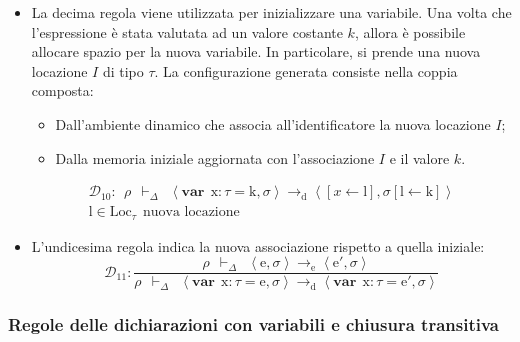 \documentclass[a4paper]{article}
\begin{document}
\begin{itemize}
 		\item La decima regola viene utilizzata per inizializzare una variabile. Una volta che l'espressione è stata valutata ad un valore costante $k$, allora è possibile allocare spazio per la nuova variabile. In particolare, si prende una nuova locazione $I$ di tipo $\tau$. La configurazione generata consiste nella coppia composta:
 		\begin{itemize}
 			\item Dall'ambiente dinamico che associa all'identificatore la nuova locazione $I$;
 			\item Dalla memoria iniziale aggiornata con l'associazione $I$ e il valore $k$.
 		\end{itemize}
 		\begin{gather*}
 			\mathcal{D}_{10} : \:\: \rho \:\: \vdash_{\Delta} \:\: \left\langle \mathbf{var} \:\: \mathrm{x}:\tau = \mathrm{k}, \sigma \right\rangle \rightarrow_{\mathrm{d}} \left\langle \left[x \leftarrow \mathrm{l}\right], \sigma\left[\mathrm{l} \leftarrow \mathrm{k}\right] \right\rangle \\
 			\mathrm{l} \in \mathrm{Loc}_{\tau} \:\: \text{nuova locazione}
 		\end{gather*}
 		
 		\item L'undicesima regola indica la nuova associazione rispetto a quella iniziale:
 		\begin{equation*}
 			\mathcal{D}_{11} : \dfrac{
 				\rho \:\: \vdash_{\Delta} \:\: \left\langle \mathrm{e}, \sigma \right\rangle \rightarrow_{\mathrm{e}} \left\langle \mathrm{e}', \sigma \right\rangle
 			}{
 				\rho \:\: \vdash_{\Delta} \:\: \left\langle \mathbf{var} \:\: \mathrm{x}:\tau = \mathrm{e}, \sigma \right\rangle \rightarrow_{\mathrm{d}} \left\langle \mathbf{var} \:\: \mathrm{x}:\tau = \mathrm{e}', \sigma \right\rangle
 			}
 		\end{equation*}
	\end{itemize}\newpage
 	
 	\subsubsection{Regole delle dichiarazioni con variabili e chiusura transitiva}
 	
\end{document}
